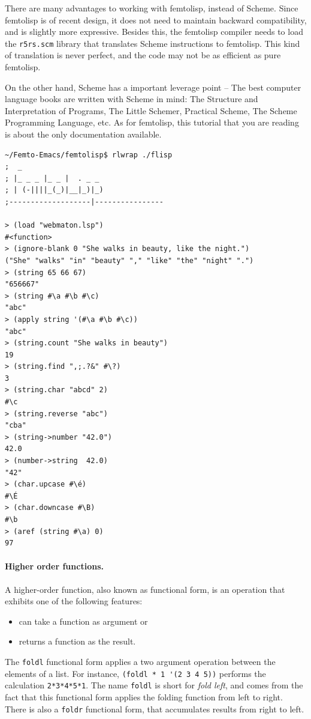\documentclass[a4paper,12pt]{book}
\begin{document}
There are many advantages to working
with femtolisp, instead of Scheme.
Since femtolisp is of recent design,
it does not need to maintain backward
compatibility, and is slightly more
expressive. Besides this, the
femtolisp compiler  needs
to load the \verb|r5rs.scm| library
that translates Scheme instructions
to femtolisp. This kind of translation
is never perfect, and the code may not
be as efficient as pure femtolisp.

On the other hand,  Scheme has a important
leverage point -- The best computer language
books are written with Scheme in mind: 
The Structure and Interpretation of Programs, 
The Little Schemer,
Practical Scheme,
The Scheme Programming Language,  etc.
As for femtolisp, this tutorial that you
are reading is about the only documentation
available.


\begin{verbatim}
~/Femto-Emacs/femtolisp$ rlwrap ./flisp
;  _
; |_ _ _ |_ _ |  . _ _
; | (-||||_(_)|__|_)|_)
;-------------------|----------------

> (load "webmaton.lsp")
#<function>
> (ignore-blank 0 "She walks in beauty, like the night.")
("She" "walks" "in" "beauty" "," "like" "the" "night" ".")
> (string 65 66 67)
"656667"
> (string #\a #\b #\c)
"abc"
> (apply string '(#\a #\b #\c))
"abc"
> (string.count "She walks in beauty")
19
> (string.find ",;.?&" #\?)
3
> (string.char "abcd" 2)
#\c
> (string.reverse "abc")
"cba"
> (string->number "42.0")
42.0
> (number->string  42.0)
"42"
> (char.upcase #\é)
#\É
> (char.downcase #\B)
#\b
> (aref (string #\a) 0)
97
\end{verbatim}

\paragraph{Higher order functions.}
A higher-order function, also known as
functional form, is an operation that
exhibits one of the following features:
\begin{itemize}
  \item can take a function as argument or
  \item returns a function as the result.
\end{itemize}

The \verb|foldl| functional form applies
a two argument operation between the
elements of a list. For instance,
\verb|(foldl * 1 '(2 3 4 5))| performs
the calculation \verb|2*3*4*5*1|.
The name \verb|foldl| is short for
{\em fold left}, and comes from the
fact that this functional form applies
the folding function from left to right.
There is also a \verb|foldr| functional
form, that accumulates results from
 right to left.\\
 
\end{document}
